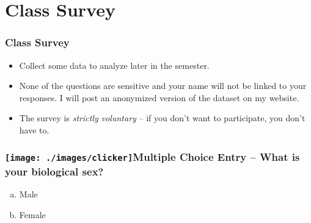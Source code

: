 \section{Class Survey}
\begin{frame}\frametitle{Class Survey}
 
\begin{itemize}
	\item Collect some data to analyze later in the semester.
	\item None of the questions are sensitive and your name will not be linked to your responses. I will post an anonymized version of the dataset on my website.
	\item The survey is \emph{strictly voluntary} -- if you don't want to participate, you don't have to.
\end{itemize}


\end{frame}


\begin{frame}

  \frametitle{\texttt{[image: ./images/clicker]}\hfill  Multiple Choice Entry -- What is your biological sex?}
\begin{enumerate}[(a)]
	\item Male
	\item Female
\end{enumerate}

\end{frame}

%
%
%
%
%

